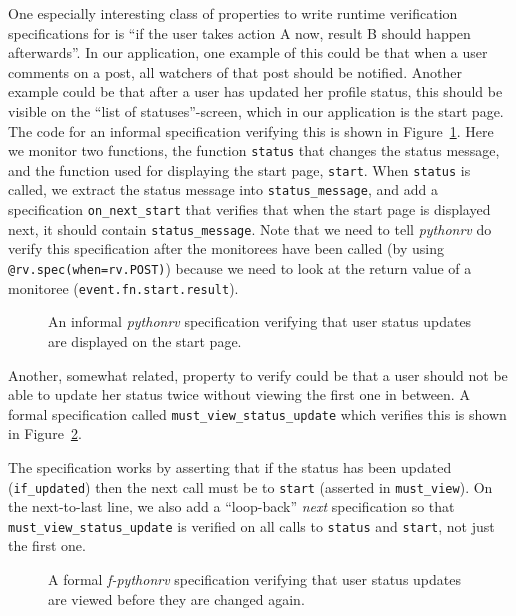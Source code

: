One especially interesting class of properties to write runtime verification
specifications for is ``if the user takes action A now, result B should happen
afterwards''. In our application, one example of this could be that when a user
comments on a post, all watchers of that post should be notified. Another
example could be that after a user has updated her profile status, this should
be visible on the ``list of statuses''-screen, which in our application is the
start page. The code for an informal specification verifying this is shown in
Figure~\ref{figure-app-status-update-displayed-informal}. Here we monitor two
functions, the function \texttt{status} that changes the status message, and
the function used for displaying the start page, \texttt{start}. When
\texttt{status} is called, we extract the status message into
\texttt{status\_message}, and add a specification \texttt{on\_next\_start} that
verifies that when the start page is displayed next, it should contain
\texttt{status\_message}. Note that we need to tell \textit{pythonrv} do verify
this specification after the monitorees have been called (by using
\texttt{@rv.spec(when=rv.POST)}) because we need to look at the return value of
a monitoree (\texttt{event.fn.start.result}).

\begin{figure}[h!]
	\begin{center}
	\begin{minipage}{0.9\textwidth}
	
	\end{minipage}
	\end{center}

  \caption{An informal \textit{pythonrv} specification verifying that user
    status updates are displayed on the start page.}
	\label{figure-app-status-update-displayed-informal}
\end{figure}

Another, somewhat related, property to verify could be that a user should not
be able to update her status twice without viewing the first one in between. A
formal specification called \texttt{must\_view\_status\_update} which verifies
this is shown in Figure~\ref{figure-app-status-update-viewed-formal}.

The specification works by asserting that if the status has been updated
(\texttt{if\_updated}) then the next call must be to \texttt{start}
(asserted in \texttt{must\_view}). On the next-to-last line, we also add a
``loop-back'' \textit{next} specification so that
\texttt{must\_view\_status\_update} is verified on all calls to \texttt{status}
and \texttt{start}, not just the first one.

\begin{figure}[h!]
	\begin{center}
	\begin{minipage}{0.9\textwidth}
	
	\end{minipage}
	\end{center}

  \caption{A formal \textit{f-pythonrv} specification verifying that user status
    updates are viewed before they are changed again.}
	\label{figure-app-status-update-viewed-formal}
\end{figure}
